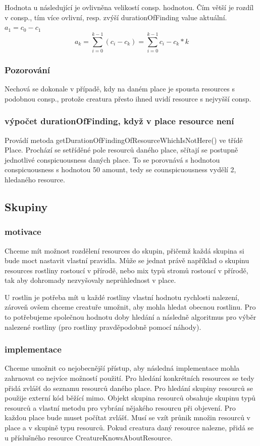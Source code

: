 \documentclass[12pt,a4paper]{report}
\begin{document}
Hodnota u následující je ovlivněna velikostí consp. hodnotou. Čím větší je rozdíl v consp., tím více ovlivní, resp. zvýší durationOfFinding value aktuální. $a_1=c_0-c_1$
$$ a_k=\sum_{i=0}^{k-1} (c_i-c_k)= \sum_{i=0}^{k-1} c_i-c_k*k$$

\subsubsection{Pozorování}
Nechová se dokonale v případě, kdy na daném place je spousta resources s podobnou consp., protože creatura přesto ihned uvidí resource s nejvyšší consp.

\subsubsection{výpočet durationOfFinding, když v place resource není}

Provádí metoda getDurationOfFindingOfResourceWhichIsNotHere() ve třídě Place. Prochází se setříděné pole resourců daného place, sčítají se postupně jednotlivé conspicuousness daných place. To se porovnává s hodnotou conspicuousness s hodnotou 50 amount, tedy se counspicuousness vydělí 2, hledaného resource. 

\subsection{Skupiny}
\subsubsection{motivace}
Chceme mít možnost rozdělení resources do skupin, přičemž každá skupina si bude moct nastavit vlastní pravidla. Může se jednat právě například o skupinu resources rostliny rostoucí v přírodě, nebo mix typů stromů rostoucí v přírodě, tak aby dohromady nezvyšovaly neprůhlednost v place.

U rostlin je potřeba mít u každé rostliny vlastní hodnotu rychlosti nalezení, zároveň ovšem chceme creatuře umožnit, aby mohla hledat obecnou rostlinu. Pro to potřebujeme společnou hodnotu doby hledání a následně algoritmus pro výběr nalezené rostliny (pro rostliny pravděpodobně pomocí náhody). 

\subsubsection{implementace}
Chceme umožnit co nejobecnější přístup, aby následná implementace mohla zahrnovat co nejvíce možností použití.
Pro hledání konkrétních resources se tedy přidá zvlášť do seznamu resourců daného place. Pro hledání skupiny resourců se použije externí kód běžící mimo. Objekt skupina resourců obsahuje skupinu typů resourců a vlastní metodu pro vybrání nějakého resourcu při objevení. Pro každou place bude muset počítat zvlášť. Musí se vzít průnik množin resourců v place a v skupině typu resourců. Pokud creatura daný resource nalezne, přidá se u příslušného resource CreatureKnowsAboutResource.
\end{document}
